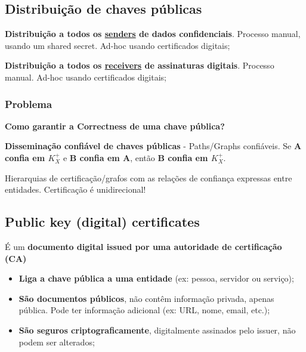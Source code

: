 \documentclass{article}
\begin{document}
\subsection{Distribuição de chaves públicas}

\begin{flushleft}
  \textbf{Distribuição a todos os \uline{senders} de dados confidenciais}.
  Processo manual, usando um shared secret. Ad-hoc usando certificados digitais;

  \vspace{2mm}

  \textbf{Distribuição a todos os \uline{receivers} de assinaturas digitais}.
  Processo manual. Ad-hoc usando certificados digitais;
\end{flushleft}

\subsubsection{Problema}

\textbf{Como garantir a Correctness de uma chave pública?}

\vspace{2mm}

\textbf{Disseminação confiável de chaves públicas} - Paths/Graphs confiáveis.
Se \textbf{A confia em $K_X^+$} e \textbf{B confia em A}, então
\textbf{B confia em $K_X^+$}.

Hierarquias de certificação/grafos com as relações de confiança
expressas entre entidades. Certificação é unidirecional!

\subsection{Public key (digital) certificates}

É um \textbf{documento digital issued por uma autoridade de certificação (CA)}

\begin{itemize}
  \item \textbf{Liga a chave pública a uma entidade} (ex: pessoa, servidor ou serviço);
  \item \textbf{São documentos públicos}, não contêm informação privada,
  apenas pública. Pode ter informação adicional (ex: URL, nome, email, etc.);
  \item \textbf{São seguros criptograficamente},
  digitalmente assinados pelo issuer, não podem ser alterados;
\end{itemize}
\end{document}
